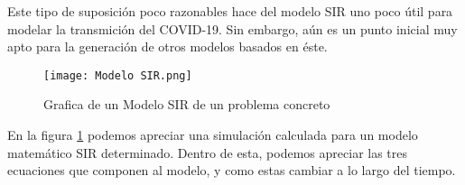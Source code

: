 Este tipo de suposición poco razonables hace del modelo SIR uno poco útil para modelar la transmición del COVID-19. Sin embargo, aún es un punto inicial muy apto para la generación de otros modelos basados en éste.

\begin{figure}
    \texttt{[image: Modelo SIR.png]}
    \caption{Grafica de un Modelo SIR de un problema concreto \cite{weiss_2013}}
    \label{grafico modelo sir}
\end{figure}

En la figura \ref{grafico modelo sir} podemos apreciar una simulación calculada para un modelo matemático SIR determinado. Dentro de esta, podemos apreciar las tres ecuaciones que componen al modelo, y como estas cambiar a lo largo del tiempo.
